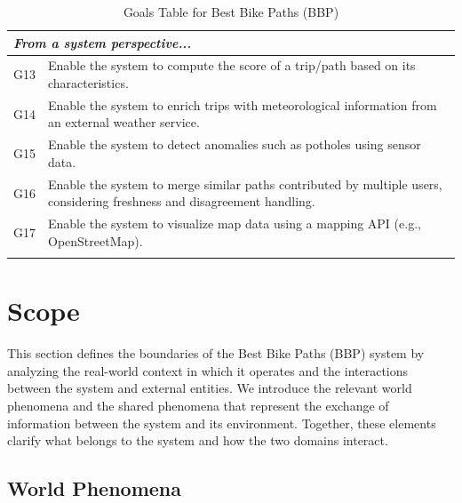\begin{longtable}{|l|p{}|}
    \multicolumn{2}{|l|}{\textit{From a system perspective...}} \\
    \hline
    G13 & Enable the system to compute the score of a trip/path based on its characteristics. \\
    \hline
    G14 & Enable the system to enrich trips with meteorological information from an external weather service. \\
    \hline
    G15 & Enable the system to detect anomalies such as potholes using sensor data. \\
    \hline
    G16 & Enable the system to merge similar paths contributed by multiple users, considering freshness and disagreement handling. \\
    \hline
    G17 & Enable the system to visualize map data using a mapping API (e.g., OpenStreetMap). \\
    \hline

    \caption{Goals Table for Best Bike Paths (BBP)}
\end{longtable}
\label{tab:goalsBBP}

\section{Scope}
\label{sec:scope}%

\par This section defines the boundaries of the Best Bike Paths (BBP) system by analyzing the real-world context in which it operates and the interactions between the system and external entities. We introduce the relevant world phenomena and the shared phenomena that represent the exchange of information between the system and its environment. Together, these elements clarify what belongs to the system and how the two domains interact.

\subsection{World Phenomena}
\label{subsec:world-phenomena}%

